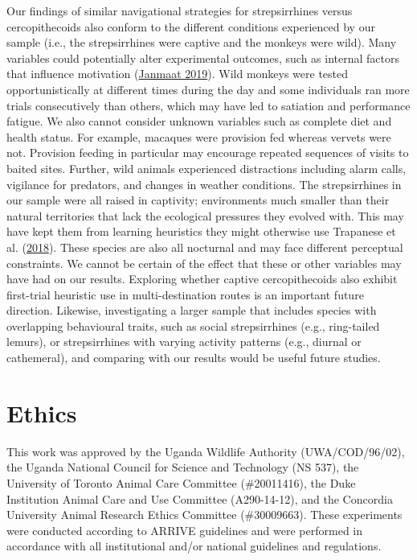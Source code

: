 \documentclass[twoside,12pt,final]{ucthesis-CA2012}
\begin{document}
\begin{ucmainmatter}
Our findings of similar navigational strategies for strepsirrhines versus cercopithecoids also conform to the different conditions experienced by our sample (i.e., the strepsirrhines were captive and the monkeys were wild). Many variables could potentially alter experimental outcomes, such as internal factors that influence motivation (\protect\hyperlink{ref-janmaat2019}{Janmaat 2019}). Wild monkeys were tested opportunistically at different times during the day and some individuals ran more trials consecutively than others, which may have led to satiation and performance fatigue. We also cannot consider unknown variables such as complete diet and health status. For example, macaques were provision fed whereas vervets were not. Provision feeding in particular may encourage repeated sequences of visits to baited sites. Further, wild animals experienced distractions including alarm calls, vigilance for predators, and changes in weather conditions. The strepsirrhines in our sample were all raised in captivity; environments much smaller than their natural territories that lack the ecological pressures they evolved with. This may have kept them from learning heuristics they might otherwise use Trapanese et al. (\protect\hyperlink{ref-trapanese2018}{2018}). These species are also all nocturnal and may face different perceptual constraints. We cannot be certain of the effect that these or other variables may have had on our results. Exploring whether captive cercopithecoids also exhibit first-trial heuristic use in multi-destination routes is an important future direction. Likewise, investigating a larger sample that includes species with overlapping behavioural traits, such as social strepsirrhines (e.g., ring-tailed lemurs), or strepsirrhines with varying activity patterns (e.g., diurnal or cathemeral), and comparing with our results would be useful future studies.

\hypertarget{ethics}{%
\section{Ethics}\label{ethics}}

This work was approved by the Uganda Wildlife Authority (UWA/COD/96/02), the Uganda National Council for Science and Technology (NS 537), the University of Toronto Animal Care Committee (\#20011416), the Duke Institution Animal Care and Use Committee (A290-14-12), and the Concordia University Animal Research Ethics Committee (\#30009663). These experiments were conducted according to ARRIVE guidelines and were performed in accordance with all institutional and/or national guidelines and regulations.


\end{ucmainmatter}
\end{document}
